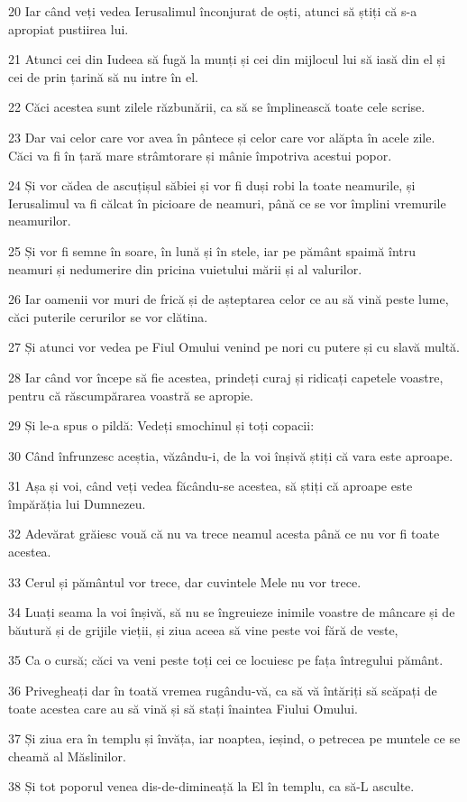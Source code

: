 \par 20 Iar când veți vedea Ierusalimul înconjurat de oști, atunci să știți că s-a apropiat pustiirea lui.
\par 21 Atunci cei din Iudeea să fugă la munți și cei din mijlocul lui să iasă din el și cei de prin țarină să nu intre în el.
\par 22 Căci acestea sunt zilele răzbunării, ca să se împlinească toate cele scrise.
\par 23 Dar vai celor care vor avea în pântece și celor care vor alăpta în acele zile. Căci va fi în țară mare strâmtorare și mânie împotriva acestui popor.
\par 24 Și vor cădea de ascuțișul săbiei și vor fi duși robi la toate neamurile, și Ierusalimul va fi călcat în picioare de neamuri, până ce se vor împlini vremurile neamurilor.
\par 25 Și vor fi semne în soare, în lună și în stele, iar pe pământ spaimă întru neamuri și nedumerire din pricina vuietului mării și al valurilor.
\par 26 Iar oamenii vor muri de frică și de așteptarea celor ce au să vină peste lume, căci puterile cerurilor se vor clătina.
\par 27 Și atunci vor vedea pe Fiul Omului venind pe nori cu putere și cu slavă multă.
\par 28 Iar când vor începe să fie acestea, prindeți curaj și ridicați capetele voastre, pentru că răscumpărarea voastră se apropie.
\par 29 Și le-a spus o pildă: Vedeți smochinul și toți copacii:
\par 30 Când înfrunzesc aceștia, văzându-i, de la voi înșivă știți că vara este aproape.
\par 31 Așa și voi, când veți vedea făcându-se acestea, să știți că aproape este împărăția lui Dumnezeu.
\par 32 Adevărat grăiesc vouă că nu va trece neamul acesta până ce nu vor fi toate acestea.
\par 33 Cerul și pământul vor trece, dar cuvintele Mele nu vor trece.
\par 34 Luați seama la voi înșivă, să nu se îngreuieze inimile voastre de mâncare și de băutură și de grijile vieții, și ziua aceea să vine peste voi fără de veste,
\par 35 Ca o cursă; căci va veni peste toți cei ce locuiesc pe fața întregului pământ.
\par 36 Privegheați dar în toată vremea rugându-vă, ca să vă întăriți să scăpați de toate acestea care au să vină și să stați înaintea Fiului Omului.
\par 37 Și ziua era în templu și învăța, iar noaptea, ieșind, o petrecea pe muntele ce se cheamă al Măslinilor.
\par 38 Și tot poporul venea dis-de-dimineață la El în templu, ca să-L asculte.

